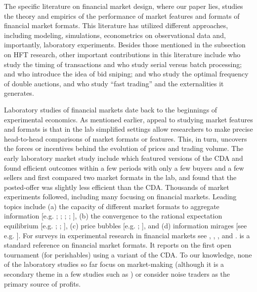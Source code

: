 The specific literature on financial market design, where our paper lies, studies the theory and empirics of the performance of market features and formats of financial market formats. This literature has utilized different approaches, including modeling, simulations, econometrics on observational data and, importantly, laboratory experiments. Besides those mentioned in the subsection on HFT research, other important contributions in this literature include \cite{Roth1994} who study the timing of transactions and \cite{Roth1997} who study serial versus batch processing; \cite{Foucault1999} and \cite{Roth2002} who introduce the idea of bid sniping; \cite{Du2017} and \cite{Fricke} who study the optimal frequency of double auctions, and \cite{Biais2014a} who study “fast trading” and the externalities it generates.

Laboratory studies of financial markets date back to the beginnings of experimental economics. As mentioned earlier, appeal to studying market features and formats is that in the lab simplified settings allow researchers to make precise head-to-head comparisons of market formats or features. This, in turn, uncovers the forces or incentives behind the evolution of prices and trading volume. The early laboratory market study include \cite{Smith1962} which featured versions of the CDA and found efficient outcomes within a few periods with only a few buyers and a few sellers and \cite{Plott1978} first compared two market formats in the lab, and found that the posted-offer was slightly less efficient than the CDA. Thousands of market experiments followed, including many focusing on financial markets. Leading topics include (a) the capacity of different market formats to aggregate information [e.g. \cite{Plott1982}; \cite{Plott1988}; \cite{Forsythe1990}; \cite{Copeland1987}; \cite{Copeland1991}], (b) the convergence to the rational expectation equilibrium [e.g. \cite{Forsythe1982}; \cite{Forsythe1984}; \cite{Friedman1984}], (c) price bubbles [e.g. \cite{Smith1988}; \cite{Noussair2006}], and (d) information mirages [see e.g. \cite{Camerer1991}]. For surveys in experimental research in financial markets see \cite{Holt1995}, \cite{Sunder1995}, \cite{Friedman2008}, and \cite{Noussair2013}. \cite{Friedman1993} is a standard reference on financial market formats. It reports on the first open tournament (for perishables) using a variant of the CDA. To our knowledge, none of the laboratory studies so far focus on market-making (although it is a secondary theme in a few studies such as \cite{Friedman1993}) or consider noise traders as the primary source of profits.

